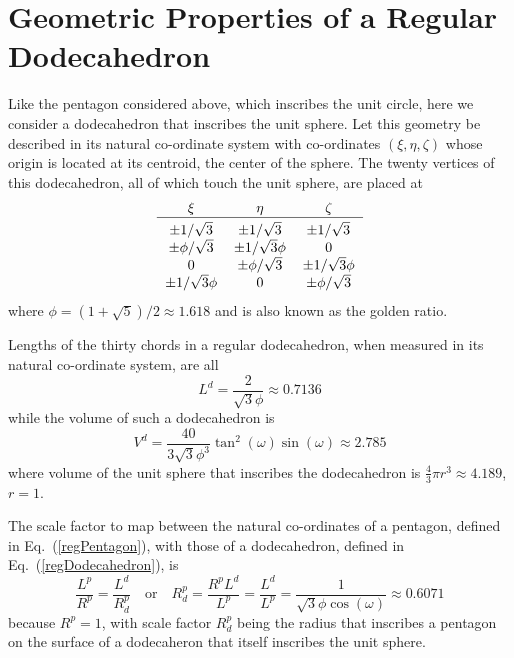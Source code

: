 \section{Geometric Properties of a Regular Dodecahedron}

Like the pentagon considered above, which inscribes the unit circle, here we consider a dodecahedron that inscribes the unit sphere.  Let this geometry be described in its natural co-ordinate system with co-ordinates $(\xi , \eta , \zeta )$ whose origin is located at its centroid, the center of the sphere.  The twenty vertices of this dodecahedron, all of which touch the unit sphere, are placed at
\begin{equation}
\begin{tabular}{ccc}
	$\xi$ & $\eta$ & $\zeta$ \\ \hline
	$\pm 1 / \sqrt{3}$ & $\pm 1 / \sqrt{3}$ & $\pm 1 / \sqrt{3}^{\vphantom{|}}$ \\
	$\pm \phi / \sqrt{3}$ & $\pm 1 / \sqrt{3} \phi$ & 0 \\
	0 & $\pm \phi / \sqrt{3}$ & $\pm 1 / \sqrt{3} \phi$ \\
	$\pm 1 / \sqrt{3} \phi$ & 0 & $\pm \phi / \sqrt{3}$
\end{tabular}
\label{regDodecahedron}
\end{equation}
where $\phi = (1 + \sqrt{5})/2 \approx 1.618$ and is also known as the golden ratio.

Lengths of the thirty chords in a regular dodecahedron, when measured in its natural co-ordinate system, are all
\begin{equation}
	L^{\!d} = \frac{2}{\sqrt{3} \phi} \approx 0.7136
	\label{regDodecahedronLength}
\end{equation}
while the volume of such a dodecahedron is
\begin{equation}
	V^d = \frac{40}{3 \sqrt{3} \phi^3} \tan^2 ( \omega ) \sin ( \omega ) \approx 2.785
\label{regDodecahedronVolume}
\end{equation}
where volume of the unit sphere that inscribes the dodecahedron is $\tfrac{4}{3} \pi r^3 \approx 4.189$, $r=1$.

The scale factor to map between the natural co-ordinates of a pentagon, defined in Eq.~(\ref{regPentagon}), with those of a dodecahedron, defined in Eq.~(\ref{regDodecahedron}), is
\begin{equation}
	\frac{L^{\!p}}{R^p} = \frac{L^{\!d}}{R^p_d} 
	\quad \text{or} \quad
	R^p_d = \frac{R^p L^{\!d}}{L^{\!p}} = \frac{L^{\!d}}{L^{\!p}} = 
	\frac{1}{\sqrt{3} \phi \cos (\omega)} \approx 0.6071
	\label{scaleFactor}
\end{equation}
because $R^p = 1$, with scale factor $R^p_d$ being the radius that inscribes a pentagon on the surface of a dodecaheron that itself inscribes the unit sphere.

